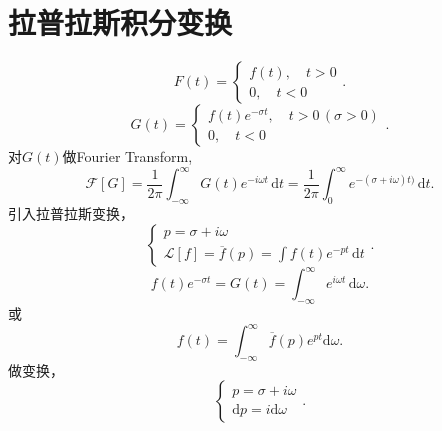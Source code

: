 \documentclass[12pt,a4paper,openany,twoside]{book}
\numberwithin{equation}{section}
\begin{document}
      \section{拉普拉斯积分变换}
        \begin{equation}
          F(t) = 
          \begin{cases}
            f(t),\quad t>0 \\
            0, \quad t<0
          \end{cases}
        .
        \end{equation} 
        \begin{equation}
          G(t) =
          \begin{cases}
          f(t)e^{-\sigma t}, \quad t>0 \,(\sigma > 0) \\
          0, \quad t<0
          \end{cases}
        .
        \end{equation} 
        对$G(t)$做Fourier Transform,
        \begin{equation}
          \mathcal{F}[G] = \frac{1}{2\pi} \int _{-\infty}^{\infty}G(t) e^{-i\omega t} \, \mathrm{d}t = \frac{1}{2\pi} \int _0^\infty e^{-(\sigma + i \omega) t)} \, \mathrm{d}t  
        .
        \end{equation} 
        引入拉普拉斯变换，
        \begin{equation}
        \begin{cases}
          p = \sigma + i \omega \\
          \mathcal{L}[f] = \overline{f}(p) = \int f(t) e^{-pt} \, \mathrm{d}t 
        \end{cases}
        .
        \end{equation} 
        \begin{equation}
          f(t)e^{-\sigma t} = G(t) = \int _{-\infty} ^ {\infty} e^{i\omega t} \, \mathrm{d}\omega 
        .
        \end{equation} 
        或
        \begin{equation}
          f(t) = \int_{-\infty}^{\infty} \overline{f}(p) e^{pt} \mathrm{d}\omega
        .
        \end{equation} 
        做变换，
        \begin{equation}
        \begin{cases}
          p = \sigma + i \omega \\
          \mathrm{d}p = i\mathrm{d}\omega
        \end{cases}
        .
        \end{equation}
\end{document}
